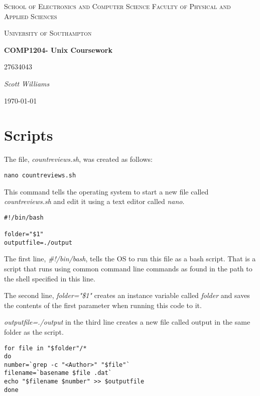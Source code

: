 \documentclass{article}
\begin{document}
\begin{titlepage}
\centering
{\scshape\LARGE School of Electronics and Computer Science Faculty of Physical and Applied Sciences \par}
\vspace{1cm}
{\scshape\Large University of Southampton\par}
\vspace{1.5cm}
{\huge\bfseries COMP1204- Unix Coursework\par}
\vspace{2cm}
{\Large\scshape 27634043 \par}
{\Large\itshape Scott Williams\par}

\vspace{2cm}
{\large \today\par}
\end{titlepage}

\section{Scripts}

The file, {\it countreviews.sh}, was created as follows:

\begin{lstlisting}
nano countreviews.sh
\end{lstlisting}

This command tells the operating system to start a new file called \textit{countreviews.sh} and edit it using a text editor called \textit{nano}.

\begin{lstlisting}
#!/bin/bash

folder="$1"
outputfile=./output
\end{lstlisting}

The first line, {\it \#!/bin/bash}, tells the OS to run this file as a bash script. That is a script that runs using common command line commands as found in the path to the shell specified in this line. \par The second line, \textit{folder="\$1"} creates an instance variable called \textit{folder} and saves the contents of the first parameter when running this code to it. \par {\it outputfile=./output} in the third line creates a new file called output in the same folder as the script.

\begin{lstlisting}
for file in "$folder"/*
do
number=`grep -c "<Author>" "$file"`
filename=`basename $file .dat`
echo "$filename $number" >> $outputfile
done
\end{lstlisting}
\end{document}
